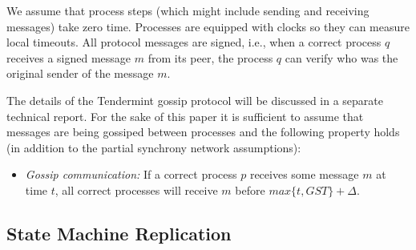 We assume that process steps (which might include sending and receiving
messages) take zero time.  Processes are equipped with clocks so they can
measure local timeouts.  All protocol messages are signed, i.e., when a correct
process $q$ receives a signed message $m$ from its peer, the process $q$ can
verify who was the original sender of the message $m$.

The details of the Tendermint gossip protocol will be discussed in a separate
technical report. For the sake of this paper it is sufficient to assume that
messages are being gossiped between processes and the following property holds
(in addition to the partial synchrony network assumptions):

\begin{itemize} \item \emph{Gossip communication:} If a correct process $p$
    receives some message $m$ at time $t$, all correct processes will receive
    $m$ before $max\{t, GST\} + \Delta$.    \end{itemize}




\subsection{State Machine Replication}

